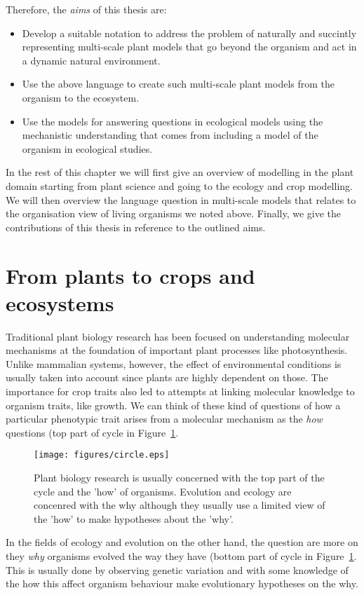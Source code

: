 \documentclass[phd]{infthesis}
\begin{document}
Therefore, the \emph{aims} of this thesis are:
\begin{itemize}
\item Develop a suitable notation to address the problem of naturally and
  succintly representing multi-scale plant models that go beyond the organism
  and act in a dynamic natural environment.
\item Use the above language to create such multi-scale plant models from the
  organism to the ecosystem.
\item Use the models for answering questions in ecological models using the
  mechanistic understanding that comes from including a model of the organism in
  ecological studies.
\end{itemize}

In the rest of this chapter we will first give an overview of modelling in the
plant domain starting from plant science and going to the ecology and crop
modelling. We will then overview the language question in multi-scale models that
relates to the organisation view of living organisms we noted above. Finally, we
give the contributions of this thesis in reference to the outlined aims.

\section{From plants to crops and ecosystems}
Traditional plant biology research has been focused on understanding molecular
mechanisms at the foundation of important plant processes like
photosynthesis. Unlike mammalian systems, however, the effect of environmental
conditions is usually taken into account since plants are highly dependent on
those. The importance for crop traits also led to attempts at linking molecular
knowledge to organism traits, like growth. We can think of these kind of questions
of how a particular phenotypic trait arises from a molecular mechanism as the
\emph{how} questions (top part of cycle in Figure~\ref{fig:circle}.

\begin{figure}[tb]
  \centering
  \texttt{[image: figures/circle.eps]}
  \caption{Plant biology research is usually concerned with the top part of the
    cycle and the 'how' of organisms. Evolution and ecology are concenred with
    the why although they usually use a limited view of the 'how' to make
    hypotheses about the 'why'.}
  \label{fig:circle}
\end{figure}

In the fields of ecology and evolution on the other hand, the question are more
on they \emph{why} organisms evolved the way they have (bottom part of cycle in
Figure~\ref{fig:circle}. This is usually done by observing genetic variation and
with some knowledge of the how this affect organism behaviour make evolutionary
hypotheses on the why.
\end{document}
